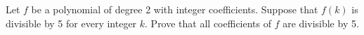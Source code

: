 Let $ f$ be a polynomial of degree 2 with integer coefficients. Suppose that $ f(k)$ is divisible by 5 for every integer $ k$. Prove that all coefficients of $ f$ are divisible by 5.